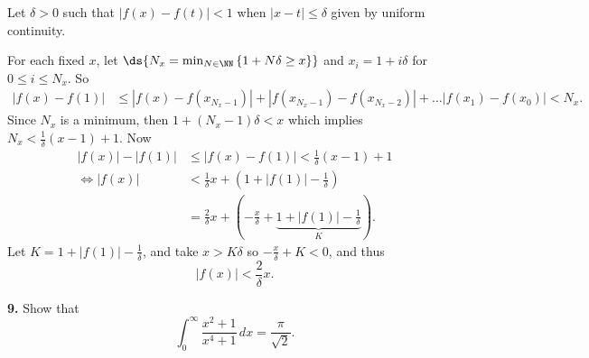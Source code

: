 \documentclass{homework}
\begin{document}
\begin{solution}
Let $\delta > 0$ such that $|f(x) - f(t)|<1$ when $|x-t| \le \delta$ given by uniform continuity.  

\begin{center}
\usetikzlibrary{decorations.pathreplacing}
\end{center}

For each fixed $x$, let $\ds{ N_x = \min_{N\in \NN} \left\{ 1+N\delta \ge x \right\} } $ and $x_i = 1 + i\delta$ for $0\le i \le N_x$. So 
\begin{align*}
  |f(x) - f(1)| 
  &\le |f(x) - f(x_{N_x-1})| + |f(x_{N_x-1}) - f(x_{N_x-2})| + \dots |f(x_1) - f(x_0)| < N_x.
\end{align*}
Since $N_x$ is a minimum, then $1+(N_x - 1)\delta < x$ which implies $N_x < \frac 1 \delta (x-1) + 1$. Now
\begin{align*}
 |f(x)| - |f(1)| &\le |f(x) - f(1)| < \frac 1\delta (x-1) + 1\\
 \iff |f(x)| &<  \frac 1\delta x + \left(1 +|f(1)| -\frac 1\delta \right)\\
 &= \frac 2\delta x + \left(-\frac x \delta + \underbrace{1 +|f(1)| -\frac 1\delta}_K \right).
\end{align*}
Let $K = 1 +|f(1)| -\frac 1\delta$, and take $x>K\delta$ so $-\frac x\delta + K < 0$, and thus
$$
  |f(x)| < \frac 2\delta x.
$$
\end{solution}

{\bf 9.} Show that
$$
  \int_0^\infty \frac{x^2+1}{x^4+1}\,dx = \frac \pi{\sqrt 2}.
$$  
\end{document}
